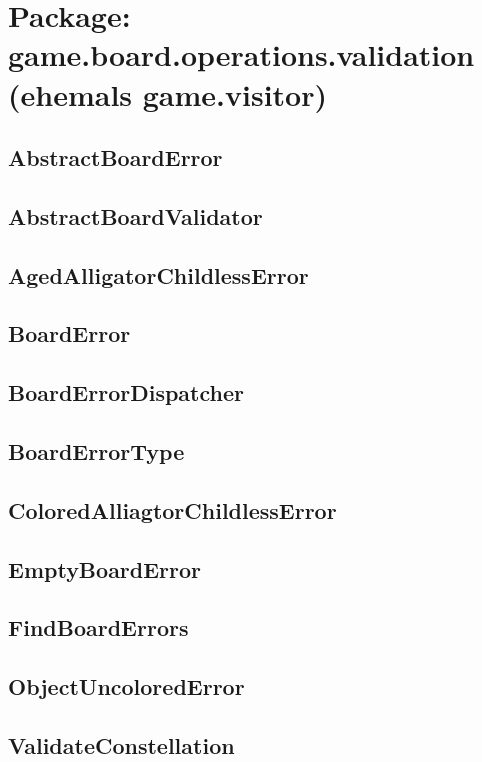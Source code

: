 \section{Package: game.board.operations.validation (ehemals game.visitor)}
\subsection{AbstractBoardError}
\subsection{AbstractBoardValidator}
\subsection{AgedAlligatorChildlessError}
\subsection{BoardError}
\subsection{BoardErrorDispatcher}
\subsection{BoardErrorType}
\subsection{ColoredAlliagtorChildlessError}
\subsection{EmptyBoardError}
\subsection{FindBoardErrors}
\subsection{ObjectUncoloredError}
\subsection{ValidateConstellation}
